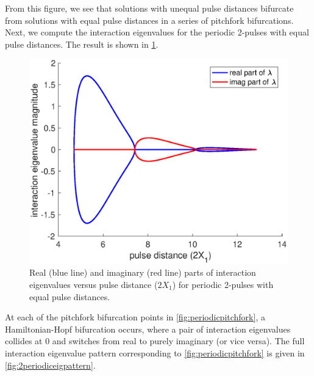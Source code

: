 \documentclass[thesis.tex]{subfiles}
\begin{document}
From this figure, we see that solutions with unequal pulse distances bifurcate from solutions with equal pulse distances in a series of pitchfork bifurcations. Next, we compute the interaction eigenvalues for the periodic 2-pulses with equal pulse distances. The result is shown in \cref{fig:periodicequaleigbif}.

\begin{figure}[H]
\includegraphics[width=12cm]{images/kdv5numerics/periodicequaleigbif.eps}
\caption{Real (blue line) and imaginary (red line) parts of interaction eigenvalues versus pulse distance ($2 X_1$) for periodic 2-pulses with equal pulse distances.}
\label{fig:periodicequaleigbif}
\end{figure}

At each of the pitchfork bifurcation points in \cref{fig:periodicpitchfork}, a Hamiltonian-Hopf bifurcation occurs, where a pair of interaction eigenvalues collides at 0 and switches from real to purely imaginary (or vice versa). The full interaction eigenvalue pattern corresponding to \cref{fig:periodicpitchfork} is given in \cref{fig:2periodiceigpattern}.
\end{document}
